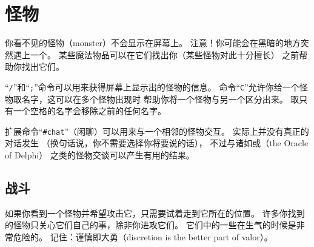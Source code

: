\documentclass[a4paper, 10pt]{article}
\begin{document}
\section{怪物}

你看不见的怪物（monster）不会显示在屏幕上。
注意！你可能会在黑暗的地方突然遇上一个。
某些魔法物品可以在它们找出你（某些怪物对此十分擅长）
之前帮助你找出它们。

“{\tt /}”和“{\tt ;}”命令可以用来获得屏幕上显示出的怪物的信息。
命令“{\tt C}”允许你给一个怪物取名字，这可以在多个怪物出现时
帮助你将一个怪物与另一个区分出来。
取只有一个空格的名字会移除之前的任何名字。

扩展命令“{\tt \#chat}”（闲聊）可以用来与一个相邻的怪物交互。
实际上并没有真正的对话发生
（换句话说，你不需要选择你将要说的话），
不过与诸如\zhTransShopkeeper{}或\zhTransOracleOfDelpi（the Oracle of Delphi）
之类的怪物交谈可以产生有用的结果。

\subsection*{战斗}

如果你看到一个怪物并希望攻击它，只需要试着走到它所在的位置。
许多你找到的怪物只关心它们自己的事，除非你进攻它们。
它们中的一些在生气的时候是非常危险的。
记住：谨慎即大勇（discretion is the better part of valor）。
\end{document}
